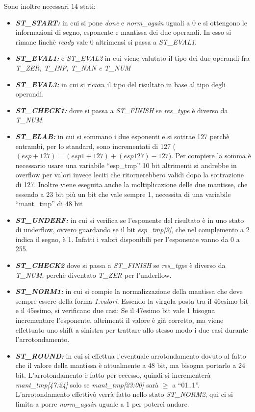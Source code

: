 \documentclass[]{IEEEtran}
\begin{document}
Sono inoltre necessari 14 stati:
\begin{itemize}
    \item {\it\bf ST\_START:} in cui si pone {\it done} e {\it norm\_again} uguali a 0 e si ottengono le informazioni di segno, esponente e mantissa dei due operandi. In esso si rimane finchè {\it ready} vale 0 altrimensi si passa a {\it ST\_EVAL1}.
    \item {\it\bf ST\_EVAL1:} e {\it ST\_EVAL2} in cui viene valutato il tipo dei due operandi fra {\it T\_ZER, T\_INF, T\_NAN e T\_NUM}
    \item {\it\bf ST\_EVAL3:} in cui si ricava il tipo del risultato in base al tipo degli operandi.
    \item {\it\bf ST\_CHECK1:} dove si passa a {\it ST\_FINISH} se {\it res\_type} è diverso da {\it T\_NUM}.
    \item {\it\bf ST\_ELAB:} in cui si sommano i due esponenti e si sottrae 127 perchè entrambi, per lo standard, sono incrementati di 127 (\((esp+127) = (esp1+127)+(esp127) - 127\)). Per compiere la somma è necessario usare una variabile ``esp\_tmp'' 10 bit altrimenti si andrebbe in overflow per valori invece leciti che ritornerebbero validi dopo la sottrazione di 127. Inoltre viene eseguita anche la moltiplicazione delle due mantisse, che essendo a 23 bit più un bit che vale sempre 1, necessita di una variabile ``mant\_tmp'' di 48 bit
    \item {\it\bf ST\_UNDERF:} in cui si verifica se l'esponente del risultato è in uno stato di underflow, ovvero guardando se il bit {\it esp\_tmp[9]}, che nel complemento a 2 indica il segno, è 1. Infatti i valori disponibili per l'esponente vanno da 0 a 255.
    \item {\it\bf ST\_CHECK2} dove si passa a {\it ST\_FINISH} se {\it res\_type} è diverso da {\it T\_NUM}, perchè diventato {\it T\_ZER} per l'underflow.
    \item {\it\bf ST\_NORM1:} in cui si compie la normalizzazione della mantissa che deve sempre essere della forma {\it 1.valori}. Essendo la virgola posta tra il 46esimo bit e il 45esimo, si verificano due casi: Se il 47esimo bit vale 1 bisogna incrementare l'esponente, altrimenti il valore è già corretto, ma viene effettuato uno shift a sinistra per trattare allo stesso modo i due casi durante l'arrotondamento.
    \item {\it\bf ST\_ROUND:} in cui si effettua l'eventuale arrotondamento dovuto al fatto che il valore della mantissa è attualmente a 48 bit, ma bisogna portarlo a 24 bit. L'arrotondamento è fatto per eccesso, quindi si incrementerà {\it mant\_tmp[47:24]} solo se {\it mant\_tmp[23:00]} sarà \( \geq \) a ``01..1''. L'arrotondamento effettivò verrà fatto nello stato {\it ST\_NORM2}, qui ci si limita a porre {\it norm\_again} uguale a 1 per poterci andare.

\end{itemize}
\end{document}
